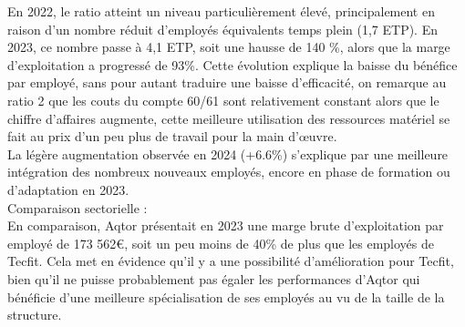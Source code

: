 En 2022, le ratio atteint un niveau particulièrement élevé, principalement en raison d’un nombre réduit d’employés équivalents temps plein (1,7 ETP). En 2023, ce nombre passe à 4,1 ETP, soit une hausse de 140 \%, alors que la marge d’exploitation a progressé de 93\%. Cette évolution explique la baisse du bénéfice par employé, sans pour autant traduire une baisse d’efficacité, on remarque au ratio 2 que les couts du compte 60/61 sont relativement constant alors que le chiffre d’affaires augmente, cette meilleure utilisation des ressources matériel se fait au prix d’un peu plus de travail pour la main d’œuvre.\\
La légère augmentation observée en 2024 (+6.6\%) s’explique par une meilleure intégration des nombreux nouveaux employés, encore en phase de formation ou d’adaptation en 2023.\\ 
Comparaison sectorielle :\\
En comparaison, Aqtor présentait en 2023 une marge brute d’exploitation par employé de 173 562€, soit un peu moins de 40\% de plus que les employés de Tecfit. Cela met en évidence qu’il y a une possibilité d’amélioration pour Tecfit, bien qu’il ne puisse probablement pas égaler les performances d’Aqtor qui bénéficie d’une meilleure spécialisation de ses employés au vu de la taille de la structure. \\

